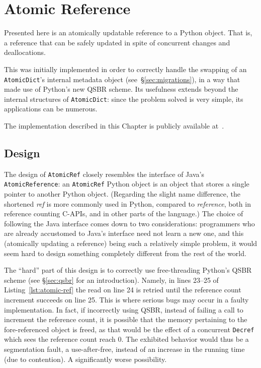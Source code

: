 \chapter{Atomic Reference}\label{ch:atomic-reference}

Presented here is an atomically updatable reference to a Python object.
That is, a reference that can be safely updated in spite of concurrent changes and deallocations.

This was initially implemented in order to correctly handle the swapping of an \texttt{AtomicDict}'s internal metadata object (see~\S\ref{sec:migrations}), in a way that made use of Python's new QSBR scheme.
Its usefulness extends beyond the internal structures of \texttt{AtomicDict}: since the problem solved is very simple, its applications can be numerous.

The implementation described in this Chapter is publicly available at~\cite[src/cereggii/atomic\_ref.c]{cereggii}.


\section{Design}\label{sec:design}

The design of \texttt{AtomicRef} closely resembles the interface of Java's \texttt{AtomicReference}: an \texttt{AtomicRef} Python object is an object that stores a single pointer to another Python object.
(Regarding the slight name difference, the shortened \emph{ref} is more commonly used in Python, compared to \emph{reference}, both in reference counting C-APIs, and in other parts of the language.)
The choice of following the Java interface comes down to two considerations: programmers who are already accustomed to Java's interface need not learn a new one, and this (atomically updating a reference) being such a relatively simple problem, it would seem hard to design something completely different from the rest of the world.

The ``hard'' part of this design is to correctly use free-threading Python's QSBR scheme (see \S\ref{sec:qsbr} for an introduction).
Namely, in lines 23--25 of Listing~\ref{lst:atomic-ref} the read on line 24 is retried until the reference count increment succeeds on line 25.
This is where serious bugs may occur in a faulty implementation.
In fact, if incorrectly using QSBR, instead of failing a call to increment the reference count, it is possible that the memory pertaining to the fore-referenced object is freed, as that would be the effect of a concurrent \texttt{Decref} which sees the reference count reach 0.
The exhibited behavior would thus be a segmentation fault, a use-after-free, instead of an increase in the running time (due to contention).
A significantly worse possibility.

